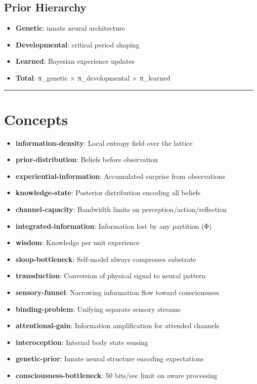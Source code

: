 \documentclass[
  11pt,
  letterpaper,
  twoside,
  openany]{book}
\makeatletter
\providecommand{\tightlist}{%
  \setlength{\itemsep}{0pt}\setlength{\parskip}{0pt}}
\let\orig@section\section
\renewcommand{\section}{\needspace{8\baselineskip}\orig@section}
\let\orig@subsection\subsection
\renewcommand{\subsection}{\needspace{6\baselineskip}\orig@subsection}
\makeatother
\begin{document}
\subsection{Prior Hierarchy}\label{prior-hierarchy}

\begin{itemize}
\tightlist
\item
  \textbf{Genetic}: innate neural architecture
\item
  \textbf{Developmental}: critical period shaping
\item
  \textbf{Learned}: Bayesian experience updates
\item
  \textbf{Total}: π\_genetic × π\_developmental × π\_learned
\end{itemize}

\begin{center}\rule{0.5\linewidth}{0.5pt}\end{center}

\section{Concepts}\label{concepts-1}

\begin{itemize}
\tightlist
\item
  \textbf{information-density}: Local entropy field over the lattice
\item
  \textbf{prior-distribution}: Beliefs before observation
\item
  \textbf{experiential-information}: Accumulated surprise from
  observations
\item
  \textbf{knowledge-state}: Posterior distribution encoding all beliefs
\item
  \textbf{channel-capacity}: Bandwidth limits on
  perception/action/reflection
\item
  \textbf{integrated-information}: Information lost by any partition (Φ)
\item
  \textbf{wisdom}: Knowledge per unit experience
\item
  \textbf{sloop-bottleneck}: Self-model always compresses substrate
\item
  \textbf{transduction}: Conversion of physical signal to neural pattern
\item
  \textbf{sensory-funnel}: Narrowing information flow toward
  consciousness
\item
  \textbf{binding-problem}: Unifying separate sensory streams
\item
  \textbf{attentional-gain}: Information amplification for attended
  channels
\item
  \textbf{interoception}: Internal body state sensing
\item
  \textbf{genetic-prior}: Innate neural structure encoding expectations
\item
  \textbf{consciousness-bottleneck}: 50 bits/sec limit on aware
  processing
\end{itemize}
\end{document}
